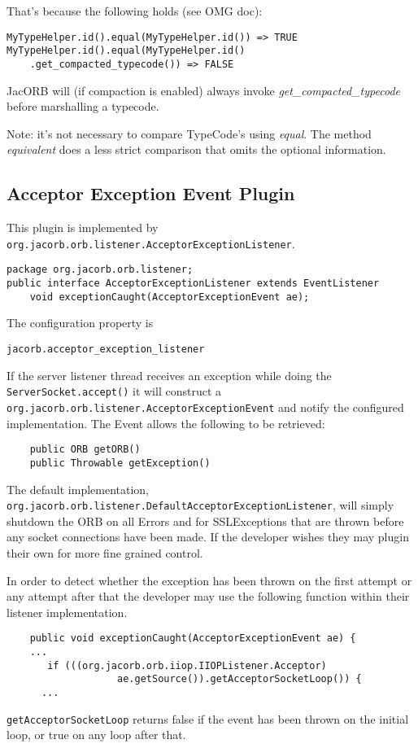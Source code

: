 That's because the following holds (see OMG doc):
\begin{verbatim}
MyTypeHelper.id().equal(MyTypeHelper.id()) => TRUE
MyTypeHelper.id().equal(MyTypeHelper.id()
    .get_compacted_typecode()) => FALSE
\end{verbatim}

JacORB will (if compaction is enabled) always invoke \emph{get\_compacted\_typecode} before marshalling a typecode.

Note: it's not necessary to compare TypeCode's using \emph{equal}. The method \emph{equivalent} does a less strict comparison
that omits the optional information.

\subsection{Acceptor Exception Event Plugin}
\label{acceptorevent}
This plugin is implemented by {\tt
org.jacorb.orb.listener.AcceptorExceptionListener}.
\begin{small}
\begin{verbatim}
package org.jacorb.orb.listener;
public interface AcceptorExceptionListener extends EventListener
    void exceptionCaught(AcceptorExceptionEvent ae);
\end{verbatim}
\end{small}
The configuration property is
\begin{verbatim}
jacorb.acceptor_exception_listener
\end{verbatim}
If the server listener thread receives an exception while doing the {\tt
ServerSocket.accept()} it will construct a {\tt
org.jacorb.orb.listener.AcceptorExceptionEvent} and notify the configured
implementation. The Event allows the following to be retrieved:
\begin{small}
\begin{verbatim}
    public ORB getORB()
    public Throwable getException()
\end{verbatim}
\end{small}
The default implementation, {\tt
org.jacorb.orb.listener.DefaultAcceptor\-ExceptionListener}, will simply shutdown
the ORB on all Errors and for SSLExceptions that are thrown before any socket
connections have been made. If the developer wishes they may plugin
their own for more fine grained control.

In order to detect whether the exception has been thrown on the first attempt
or any attempt after that the developer may use the following function within
their listener implementation.
\begin{small}
\begin{verbatim}
    public void exceptionCaught(AcceptorExceptionEvent ae) {
    ...
       if (((org.jacorb.orb.iiop.IIOPListener.Acceptor)
                   ae.getSource()).getAcceptorSocketLoop()) {
      ...
\end{verbatim}
\end{small}
{\tt getAcceptorSocketLoop} returns false if the event has been thrown on the
initial loop, or true on any loop after that.

